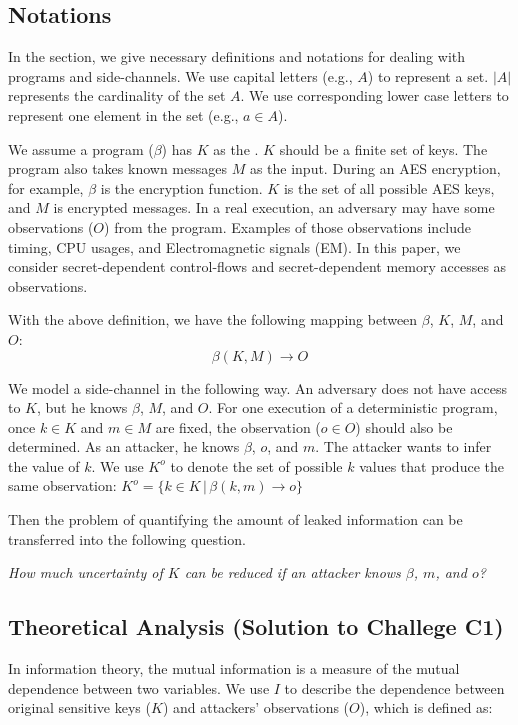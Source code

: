 \subsection{Notations}
In the section, we give necessary definitions and notations for dealing with
programs and side-channels. We use capital letters (e.g., $A$) to represent a
set. $|A|$ represents the cardinality of the set $A$. We use corresponding lower case
letters to represent one element in the set (e.g., $a \in A$).

We assume a program ($\beta$) has $K$ as the . $K$ should be 
a finite set of keys. The program also takes known messages $M$ as the input. 
During an AES encryption, for example, 
$\beta$ is the encryption function. $K$ is the set of all possible AES keys, 
and $ M $ is encrypted messages. In a real execution, an adversary may have 
some observations ($O$) from the program. Examples of those observations include 
timing, CPU usages, and Electromagnetic signals (EM). In this paper, 
we consider secret-dependent control-flows and secret-dependent memory 
accesses as observations.

With the above definition, we have the following mapping between $\beta$,
$K$, $M$, and $O$:
\begin{displaymath}
    \beta(K, M) \rightarrow O
\end{displaymath}


We model a side-channel in the following way. An adversary does not have
access to $K$, but he knows $\beta$, $M$, and $O$. For one execution of a
deterministic program, once $k \in K$ and $m \in M$ are fixed, the observation
($o \in O$) should also be determined. As an attacker, he knows $\beta$, $o$,
and $m$. The attacker wants to infer the value of $k$. We use $K^o$ to denote
the set of possible $k$ values that produce the same observation: $K^o = \{ k \in K \, |\, \beta(k, m) \rightarrow o\}$

Then the problem of quantifying the amount of leaked information can be
transferred into the following question.

\emph{How much uncertainty of $K$ can be reduced if an attacker knows $\beta$, $m$, and $o$?}

\subsection{Theoretical Analysis \textbf{(Solution to Challege C1)}}
In information theory, the mutual information  is a measure of the mutual
dependence between two variables. We use $I$ to describe the
dependence between original sensitive keys ($K$) and attackers' observations ($O$), which is defined as:

